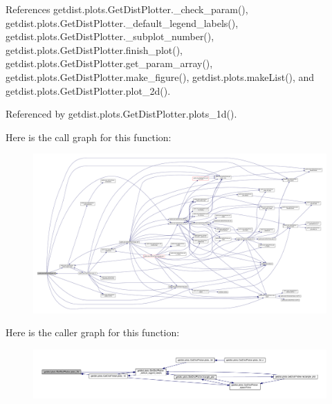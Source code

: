 References getdist.\+plots.\+Get\+Dist\+Plotter.\+\_\+check\+\_\+param(), getdist.\+plots.\+Get\+Dist\+Plotter.\+\_\+default\+\_\+legend\+\_\+labels(), getdist.\+plots.\+Get\+Dist\+Plotter.\+\_\+subplot\+\_\+number(), getdist.\+plots.\+Get\+Dist\+Plotter.\+finish\+\_\+plot(), getdist.\+plots.\+Get\+Dist\+Plotter.\+get\+\_\+param\+\_\+array(), getdist.\+plots.\+Get\+Dist\+Plotter.\+make\+\_\+figure(), getdist.\+plots.\+make\+List(), and getdist.\+plots.\+Get\+Dist\+Plotter.\+plot\+\_\+2d().



Referenced by getdist.\+plots.\+Get\+Dist\+Plotter.\+plots\+\_\+1d().

Here is the call graph for this function\+:
\nopagebreak
\begin{figure}[H]
\begin{center}
\leavevmode
\includegraphics[width=350pt]{classgetdist_1_1plots_1_1GetDistPlotter_a0e610a87566737a4b66974d2d721caaa_cgraph}
\end{center}
\end{figure}
Here is the caller graph for this function\+:
\nopagebreak
\begin{figure}[H]
\begin{center}
\leavevmode
\includegraphics[width=350pt]{classgetdist_1_1plots_1_1GetDistPlotter_a0e610a87566737a4b66974d2d721caaa_icgraph}
\end{center}
\end{figure}
\mbox{\label{classgetdist_1_1plots_1_1GetDistPlotter_a003f6bc9220702f977aaaa73c64b1cb3}} 
